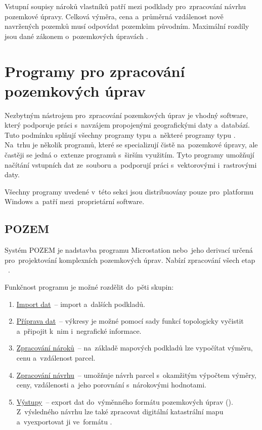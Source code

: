 Vstupní soupisy nároků vlastníků patří mezi podklady pro~zpracování
návrhu pozemkové úpravy. Celková výměra, cena a~průměrná vzdálenost
nově navržených pozemků musí odpovídat pozemkům původním. Maximální
rozdíly jsou dané záko\-nem o~pozemkových úpravách \citep{pu_zakon}.

\section{Programy pro zpracování pozemkových úprav}
\label{programy_pu}

Nezbytným nástrojem pro~zpracování pozemkových úprav je vhodný
software, který podporuje práci s~navzájem propojenými geografickými
daty a~databází. Tuto podmínku splňují všechny programy typu 
a~některé programy typu . Na~trhu je několik programů, které
se specializují čistě na~pozemkové úpravy, ale častěji se jedná
o~extenze programů s~širším využitím. Tyto programy umožňují načítání
vstupních dat ze~souboru  a~podporují práci s~vektorovými
i~rastrovými daty.

Všechny programy uvedené v~této sekci jsou distribuovány pouze
pro~platformu Windows a~patří mezi~proprietární software.

\subsection{POZEM}
\label{pozem}

Systém POZEM je nadstavba programu Microstation nebo~jeho derivací
určená pro~projektování komplexních pozemkových úprav. Nabízí
zpracování všech etap  \citep{pozem}~\citep{pu_skripta}.

Funkčnost programu je možné rozdělit do~pěti skupin: \vspace{-\topsep}
	\begin{enumerate}[leftmargin=1.5cm, noitemsep]
		\item \underline{Import dat}~– import 
a~dalších podkladů.
		\item \underline{Příprava dat}~– výkresy je možné
pomocí sady funkcí topologicky vyčistit a~připojit k~nim i~negrafické
informace.
		\item \underline{Zpracování nároků}~– na~základě
mapových podkladů lze vypočítat výměru, cenu a~vzdálenost parcel.
		\item \underline{Zpracování návrhu}~– umožňuje návrh
parcel s~okamžitým výpočtem výměry, ceny, vzdálenosti a~jeho porovnání
s~nárokovými hodnotami.
		\item \underline{Výstupy}~– export dat do~výměnného
formátu pozemkových úprav (). Z~výsledného návrhu lze také
zpracovat digitální katastrální mapu a~vyexportovat ji ve~formátu
.
	\end{enumerate}

